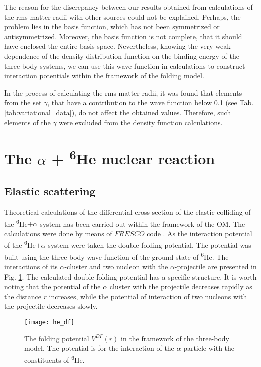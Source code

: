 \documentclass[
12pt, %
oneside, %
english, %
onehalfspacing, %
onehalfspacing, %
headsepline, %
]{MastersDoctoralThesis} %
\newcommand{\he}{\textsuperscript{6}He\xspace}
\begin{document}
The reason for the discrepancy between our results obtained from calculations of the rms matter radii with other sources could not be explained. Perhaps, the problem lies in the basis function, which has not been symmetrized or antisymmetrized. Moreover, the basis function is not complete, that it should have enclosed the entire basis space. Nevertheless, knowing the very weak dependence of the density distribution function on the binding energy of the three-body systems, we can use this wave function in calculations to construct interaction potentials within the framework of the folding model.

In the process of calculating the rms matter radii, it was found that elements from the set $\gamma$, that have a contribution to the wave function below 0.1 (see Tab.\ref{tab:variational_data}), do not affect the obtained values. Therefore, such elements of the $\gamma$ were excluded from  the density function calculations.

\newpage
\section{The $\alpha$ + \he nuclear reaction}
\subsection{Elastic scattering}

Theoretical calculations of the differential cross section of the elastic colliding of the \he$ + \alpha$ system has been carried out within the framework of the OM. 
The calculations were done by means of $FRESCO$ code \cite{fresco}. 
As the interaction potential of the \he$ + \alpha$ system were taken the double folding potential. The potential was built using the three-body wave function of the ground state of \he. The interactions of its $\alpha$-cluster and two nucleon with the $\alpha$-projectile are presented in Fig. \ref{he_df}. The calculated double folding potential has a specific structure.
It is worth noting that the potential of the $\alpha$ cluster with the projectile decreases rapidly as the distance $r$ increases, while the potential of interaction of two nucleons with the projectile decreases slowly.

\begin{figure}
\centering
\texttt{[image: he\_df]}
\decoRule
\caption{  \footnotesize  The folding potential $V^{DF}(r)$ in the framework of the three-body model. The potential is for the interaction of the $\alpha$ particle with the constituents of \he.
}
\label{he_df}
\end{figure}
\end{document}
